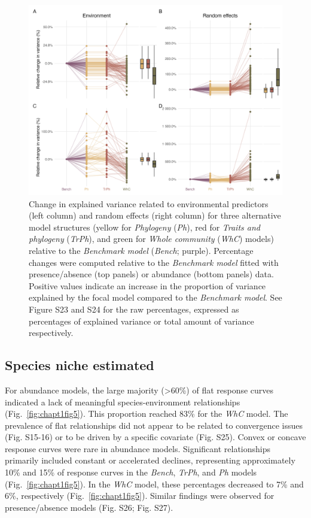 \begin{refsection}
\begin{figure}
\hypertarget{fig:chapt1fig4}{%
\centering
\includegraphics{03-Chapitre1/figures/fig4.png}
\caption[Change in explained variance related to environmental
predictors and random effects for three alternative model structures]{Change in explained variance related to environmental
predictors (left column) and random effects (right column) for three
alternative model structures (yellow for \emph{Phylogeny} (\emph{Ph}),
red for \emph{Traits and phylogeny} (\emph{TrPh}), and green for
\emph{Whole community} (\emph{WhC}) models) relative to the
\emph{Benchmark model} (\emph{Bench}; purple). Percentage changes were
computed relative to the \emph{Benchmark model} fitted with
presence/absence (top panels) or abundance (bottom panels) data.
Positive values indicate an increase in the proportion of variance
explained by the focal model compared to the \emph{Benchmark model}. See
Figure S23 and S24 for the raw percentages, expressed as percentages of
explained variance or total amount of variance
respectively.}\label{fig:chapt1fig4}
}
\end{figure}

\hypertarget{species-niche-estimated}{%
\subsection{Species niche estimated}\label{species-niche-estimated}}

For abundance models, the large majority (\textgreater60\%) of flat
response curves indicated a lack of meaningful species-environment
relationships (Fig.~\ref{fig:chapt1fig5}). This proportion reached 83\%
for the \emph{WhC} model. The prevalence of flat relationships did not
appear to be related to convergence issues (Fig. S15-16) or to be driven
by a specific covariate (Fig. S25). Convex or concave response curves
were rare in abundance models. Significant relationships primarily
included constant or accelerated declines, representing approximately
10\% and 15\% of response curves in the \emph{Bench}, \emph{TrPh}, and
\emph{Ph} models (Fig.~\ref{fig:chapt1fig5}). In the \emph{WhC} model,
these percentages decreased to 7\% and 6\%, respectively
(Fig.~\ref{fig:chapt1fig5}). Similar findings were observed for
presence/absence models (Fig. S26; Fig. S27).


\end{refsection}
